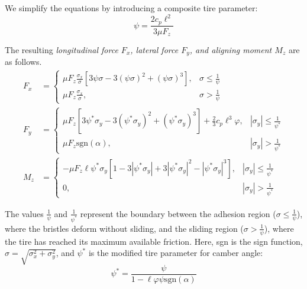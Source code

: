 \documentclass[letterpaper, 10 pt, conference]{ieeeconf}  %
\begin{document}
We simplify the equations by introducing a composite tire parameter:
\begin{equation}
    \psi=\frac{2c_{p}\ell^2}{3\mu F_z}
\end{equation}

The resulting {\em longitudinal force $F_x$, lateral force $F_y$, and aligning moment $M_z$} are as follows.
{\footnotesize
\begin{align}
    F_x &= 
    \begin{cases}
        \label{eq:Fx}
       \mu F_z \frac{\sigma_x}{\sigma} [3\psi\sigma-3(\psi\sigma)^2+(\psi \sigma)^3], & \sigma\le \frac{1}{\psi}\\
        \mu F_z \frac{\sigma_x}{\sigma} ,           & \sigma > \frac{1}{\psi}
    \end{cases} \\
    F_y &= 
    \begin{cases}
        \label{eq:Fy}
        \mu F_z [3\psi^*\sigma_{y}-3(\psi^*\sigma_{y})^2+(\psi^* \sigma_{y})^3] + \frac{2}{3}c_p\ell^3\varphi, & |\sigma_{y}|\le \frac{1}{\psi^*}\\
        \mu F_z \text{sgn}(\alpha),           & |\sigma_{y}| > \frac{1}{\psi^*}
    \end{cases} \\
    M_z &= 
    \begin{cases}
        \label{eq:Mz}
        -\mu F_z\ell\psi^*\sigma_{y} [1-3|\psi^*\sigma_{y}|+3|\psi^* \sigma_{y}|^2-|\psi^*\sigma_{y}|^3], & |\sigma_{y}|\le \frac{1}{\psi^*}\\
        0,           & |\sigma_{y}| > \frac{1}{\psi^*}
    \end{cases}
\end{align}
}


The values $\frac{1}{\psi}$ and $\frac{1}{\psi^*}$ represent the boundary between the adhesion region ($\sigma\le \frac{1}{\psi}$), where the bristles deform without sliding, and the sliding region ($\sigma> \frac{1}{\psi}$), where the tire has reached its maximum available friction. Here, sgn is the sign function, $\sigma = \sqrt{\sigma_x^2+\sigma_y^2}$, and $\psi^*$ is the modified tire parameter for camber angle:
\begin{equation}
    \psi^* = \frac{\psi}{1 - \ell\varphi\psi\text{sgn}(\alpha)}
\end{equation}
\end{document}
